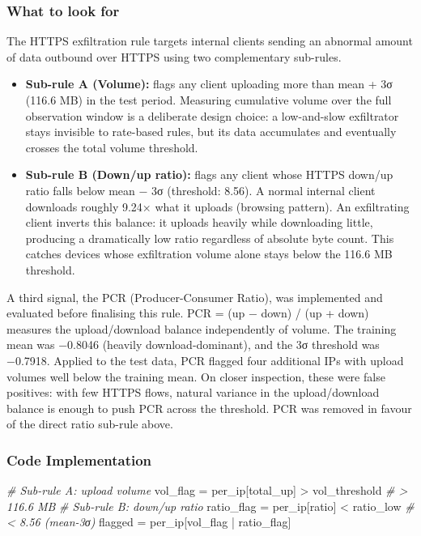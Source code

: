 \documentclass[
  11pt,
]{article}
\newenvironment{Shaded}{\vspace{4pt}}{\vspace{4pt}}
\newcommand{\CommentTok}[1]{\textcolor[rgb]{0.38,0.63,0.69}{\textit{#1}}}
\newcommand{\NormalTok}[1]{#1}
\newcommand{\OperatorTok}[1]{\textcolor[rgb]{0.40,0.40,0.40}{#1}}
\newcommand{\StringTok}[1]{\textcolor[rgb]{0.25,0.44,0.63}{#1}}
\providecommand{\tightlist}{%
  \setlength{\itemsep}{0pt}\setlength{\parskip}{0pt}}
\begin{document}
\hypertarget{what-to-look-for-2}{%
\subsubsection{What to look for}\label{what-to-look-for-2}}

The HTTPS exfiltration rule targets internal clients sending an abnormal
amount of data outbound over HTTPS using two complementary sub-rules.

\begin{itemize}
\tightlist
\item
  \textbf{Sub-rule A (Volume):} flags any client uploading more than
  mean + 3σ (116.6 MB) in the test period. Measuring cumulative volume
  over the full observation window is a deliberate design choice: a
  low-and-slow exfiltrator stays invisible to rate-based rules, but its
  data accumulates and eventually crosses the total volume threshold.
\item
  \textbf{Sub-rule B (Down/up ratio):} flags any client whose HTTPS
  down/up ratio falls below mean − 3σ (threshold: 8.56). A normal
  internal client downloads roughly 9.24× what it uploads (browsing
  pattern). An exfiltrating client inverts this balance: it uploads
  heavily while downloading little, producing a dramatically low ratio
  regardless of absolute byte count. This catches devices whose
  exfiltration volume alone stays below the 116.6 MB threshold.
\end{itemize}

A third signal, the PCR (Producer-Consumer Ratio), was implemented and
evaluated before finalising this rule. PCR = (up − down) / (up + down)
measures the upload/download balance independently of volume. The
training mean was −0.8046 (heavily download-dominant), and the 3σ
threshold was −0.7918. Applied to the test data, PCR flagged four
additional IPs with upload volumes well below the training mean. On
closer inspection, these were false positives: with few HTTPS flows,
natural variance in the upload/download balance is enough to push PCR
across the threshold. PCR was removed in favour of the direct ratio
sub-rule above.

\subsubsection{Code Implementation}

\begin{Shaded}
\begin{Highlighting}[]
\CommentTok{\# Sub-rule A: upload volume}
\NormalTok{vol\_flag   }\OperatorTok{=}\NormalTok{ per\_ip[}\StringTok{\textquotesingle{}total\_up\textquotesingle{}}\NormalTok{] }\OperatorTok{\textgreater{}}\NormalTok{ vol\_threshold   }\CommentTok{\# \textgreater{} 116.6 MB}
\CommentTok{\# Sub-rule B: down/up ratio}
\NormalTok{ratio\_flag }\OperatorTok{=}\NormalTok{ per\_ip[}\StringTok{\textquotesingle{}ratio\textquotesingle{}}\NormalTok{] }\OperatorTok{\textless{}}\NormalTok{ ratio\_low          }\CommentTok{\# \textless{} 8.56  (mean-3σ)}
\NormalTok{flagged    }\OperatorTok{=}\NormalTok{ per\_ip[vol\_flag }\OperatorTok{|}\NormalTok{ ratio\_flag]}
\end{Highlighting}
\end{Shaded}
\end{document}
